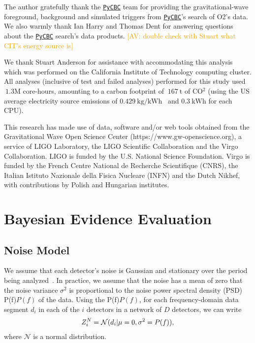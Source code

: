 \documentclass[%
 nofootinbib,
 amsmath,amssymb,
 aps,
 twocolumn,
 superscriptaddress
]{revtex4-2}
\newcommand{\pycbc}{{\sc \href{https://pycbc.org/}{\texttt{PyCBC}}}\xspace}
\newcommand{\mathcmd}[1]{{\sc \relax\ifmmode#1\else $#1$\fi}\xspace}
\newcommand{\psd}{\mathcmd{P(f)}}
\newcommand{\avi}[1]{\textcolor{orange}{[AV: #1]}}
\begin{document}

\begin{acknowledgments}

The author gratefully thank the \pycbc team for providing the gravitational-wave foreground, background and simulated triggers from \pycbc's search of O2's data. We also warmly thank Ian Harry and Thomas Dent for answering questions about the \pycbc search's data products.  
\avi{double check with Stuart what CIT's energy source is}

We thank Stuart Anderson for assistance with accommodating this analysis which was performed on the California Institute of Technology computing cluster. All analyses (inclusive of test and failed analyses) performed for this study used $~1.3\mathrm{M}$ core-hours, amounting to a carbon footprint of $~167\ \mathrm{t}$ of CO$^2$ (using the US average electricity source emissions of $0.429\ \text{kg/kWh}$~\cite{greenhouse} and $0.3\ \text{kWh}$ for each CPU).

This research has made use of data, software and/or web tools obtained from the Gravitational Wave Open Science Center (https://www.gw-openscience.org), a service of LIGO Laboratory, the LIGO Scientific Collaboration and the Virgo Collaboration. LIGO is funded by the U.S. National Science Foundation. Virgo is funded by the French Centre National de Recherche Scientifique (CNRS), the Italian Istituto Nazionale della Fisica Nucleare (INFN) and the Dutch Nikhef, with contributions by Polish and Hungarian institutes.


\end{acknowledgments}

\appendix



\section{Bayesian Evidence Evaluation}\label{sec:bayesianEvidEval}
\subsection{Noise Model}
We assume that each detector's noise is Gaussian and stationary over the period being analyzed~\cite{ligo_psd}. In practice, we assume that the noise has a mean of zero that the noise variance $\sigma^2$ is proportional to the noise power spectral density (PSD) \psd of the data. Using the \psd, for each frequency-domain data segment $d_i$ in each of the $i$ detectors in a network of $D$ detectors, we can write 
\begin{equation}
\label{eq:zn}
Z^N_i = \mathcal{N}(d_i|\mu=0,\sigma^2=\psd),
\end{equation}
where $\mathcal{N}$ is a normal distribution. 
\end{document}
